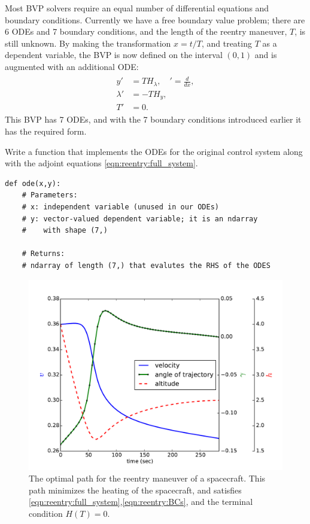 Most BVP solvers require an equal number of differential equations and boundary conditions. 
Currently we have a free boundary value problem; there are 6 ODEs and 7 boundary conditions, and the length of the reentry maneuver, $T$, is still unknown. 
By making the transformation $x = t/T$, and treating $T$ as a dependent variable, the BVP is now defined on the interval $(0,1)$ and is augmented with an additional ODE: 
\begin{align}
\begin{split}
	y' &= TH_{\lambda},\quad ' = \frac{d}{dx},\\
	\lambda' &= -TH_{y},\\
	T' &= 0. \label{eqn:reentry:full_system}
\end{split}	
\end{align}
This BVP has 7 ODEs, and with the 7 boundary conditions introduced earlier it has the required form.

\begin{problem}
	Write a function  that implements the ODEs for the original control system along with the adjoint equations \eqref{eqn:reentry:full_system}. 
\begin{lstlisting}
def ode(x,y):
	# Parameters:
	# x: independent variable (unused in our ODEs)
	# y: vector-valued dependent variable; it is an ndarray 
	# 	 with shape (7,)
	
	# Returns: 
	# ndarray of length (7,) that evalutes the RHS of the ODES
\end{lstlisting}
\end{problem}



\begin{figure}
\centering
\includegraphics[width=\textwidth]{solutions.pdf}
\caption{The optimal path for the reentry maneuver of a spacecraft. This path minimizes the heating of the spacecraft, and satisfies  \eqref{eqn:reentry:full_system},\eqref{eqn:reentry:BCs}, and the terminal condition $H(T) = 0$.
}
\label{fig:reentry:solutions}
\end{figure}



